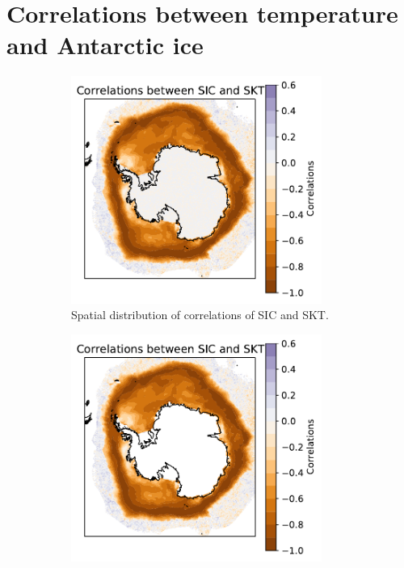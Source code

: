 \documentclass[../main.tex]{subfiles}
\begin{document}
\section{Correlations between temperature and Antarctic ice}
\label{sec:correlations_temp_ice}

\begin{figure}[h!]
\centering
\begin{subfigure}[h!]{0.49\textwidth}
\centering
\includegraphics[width=0.9\textwidth]{images/week8/hres/corr_sic_skt_longterm_spatial}
\caption{Spatial distribution of correlations of SIC and SKT.}
\end{subfigure}
\begin{subfigure}[h!]{0.49\textwidth}
\centering
\includegraphics[width=0.9\textwidth]{images/week8/hres/corr_sic_skt_longterm_spatial_anmomalous}

\end{subfigure}
\end{figure}
\end{document}
